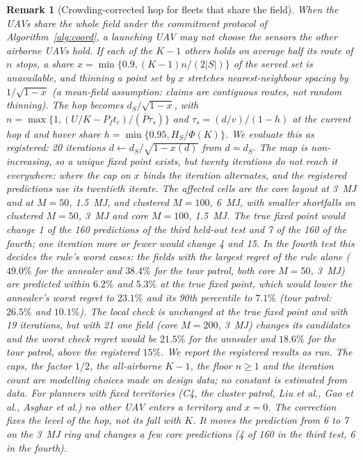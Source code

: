 \documentclass[journal,outdir=./]{IEEEtran}
\newtheorem{remark}{Remark}
\newcommand{\Pbar}{\bar{P}}
\newcommand{\Pf}{P_{f}}
\begin{document}
\begin{remark}[Crowding-corrected hop for fleets that share the field]\label{rem:crowd}
When the UAVs share the whole field under the commitment protocol of Algorithm~\ref{alg:coord}, a launching UAV may not choose the sensors the other airborne UAVs hold. If each of the $K-1$ others holds on average half its route of $n$ stops, a share $x=\min\{0.9,(K-1)n/(2|S|)\}$ of the served set is unavailable, and thinning a point set by $x$ stretches nearest-neighbour spacing by $1/\sqrt{1-x}$ (a mean-field assumption: claims are contiguous routes, not random thinning). The hop becomes $d_S/\sqrt{1-x}$, with $n=\max\{1,(U/K-\Pf t_c)/(\Pbar\tau_s)\}$ and $\tau_s=(d/v)/(1-h)$ at the current hop $d$ and hover share $h=\min\{0.95,H_S/\Phi(K)\}$. We evaluate this as registered: 20 iterations $d\leftarrow d_S/\sqrt{1-x(d)}$ from $d=d_S$. The map is non-increasing, so a unique fixed point exists, but twenty iterations do not reach it everywhere: where the cap on $x$ binds the iteration alternates, and the registered predictions use its twentieth iterate. The affected cells are the core layout at 3~MJ and at $M=50$, 1.5~MJ, and clustered $M=100$, 6~MJ, with smaller shortfalls on clustered $M=50$, 3~MJ and core $M=100$, 1.5~MJ. The true fixed point would change 1 of the 160 predictions of the third held-out test and 7 of the 160 of the fourth; one iteration more or fewer would change 4 and 15. In the fourth test this decides the rule's worst cases: the fields with the largest regret of the rule alone ($49.0\%$ for the annealer and $38.4\%$ for the tour patrol, both core $M=50$, 3~MJ) are predicted within $6.2\%$ and $5.3\%$ at the true fixed point, which would lower the annealer's worst regret to $23.1\%$ and its 90th percentile to $7.1\%$ (tour patrol: $26.5\%$ and $10.1\%$). The local check is unchanged at the true fixed point and with 19 iterations, but with 21 one field (core $M=200$, 3~MJ) changes its candidates and the worst check regret would be $21.5\%$ for the annealer and $18.6\%$ for the tour patrol, above the registered $15\%$. We report the registered results as run. The caps, the factor $1/2$, the all-airborne $K-1$, the floor $n\ge1$ and the iteration count are modelling choices made on design data; no constant is estimated from data. For planners with fixed territories (C4, the cluster patrol, Liu et al., Gao et al., Asghar et al.) no other UAV enters a territory and $x=0$. The correction fixes the level of the hop, not its fall with $K$. It moves the prediction from 6 to 7 on the 3~MJ ring and changes a few core predictions (4 of 160 in the third test, 6 in the fourth).
\end{remark}
\end{document}
